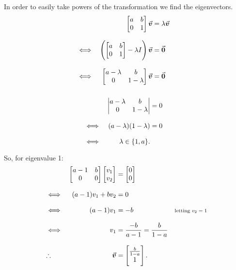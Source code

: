 \documentclass[MathsNotesBase.tex]{subfiles}
\begin{document}
{		
		In order to easily take powers of the transformation we find the eigenvectors.
		\begin{align*}
		&& 
		\begin{bmatrix}
		a & b\\
		0 & 1
		\end{bmatrix} \vec{\bm{v}} &= \lambda \vec{\bm{v}} \\[8pt]
		&\iff & \left(
		\begin{bmatrix}
		a & b\\
		0 & 1
		\end{bmatrix} - \lambda I \right) \vec{\bm{v}} &= \vec{\bm{0}} &\text{\scriptsize{}} \\[8pt]
		&\iff &
		\begin{bmatrix}
		a-\lambda & b\\
		0 & 1-\lambda
		\end{bmatrix} \vec{\bm{v}} &= \vec{\bm{0}} &\text{\scriptsize{}} \\[8pt]
		\end{align*}
	
		\begin{align*}
		&& 
		\begin{vmatrix}
		a-\lambda & b\\
		0 & 1-\lambda
		\end{vmatrix} &= 0 \\[8pt]
		&\iff & (a - \lambda)(1 - \lambda) &= 0 &\text{\scriptsize{}} \\[8pt]
		&\iff & \lambda \in \{1, a\}.
		\end{align*}
		
		So, for eigenvalue 1:
		\begin{align*}
		&& \begin{bmatrix}
		a-1 & b\\
		0 & 0
		\end{bmatrix} \begin{bmatrix}v_1\\v_2\end{bmatrix} &= \begin{bmatrix}0\\0\end{bmatrix} \\[8pt]
		&\iff & (a - 1)v_1 + b v_2 &= 0 &\text{\scriptsize{}} \\[8pt]
		&\iff & (a - 1)v_1 &= -b &\text{\scriptsize{letting ${ v_2 = 1 }$}} \\[8pt]
		&\iff & v_1 &= \frac{-b}{a - 1} = \frac{b}{1 - a}\\[8pt]
		&\therefore & \vec{\bm{v}} &= \begin{bmatrix}\frac{b}{1 - a}\\1\end{bmatrix}.
		\end{align*}
		
}
\end{document}
